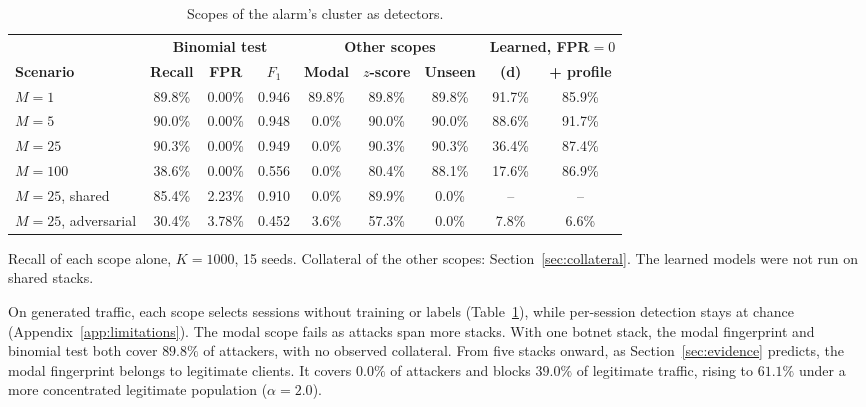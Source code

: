 \documentclass[conference,letterpaper,10pt]{IEEEtran}
\newcommand\1{\textit{(i)}}
\newcommand\2{\textit{(ii)}}
\newcommand\3{\textit{(iii)}}
\newcommand\4{\textit{(iv)}}
\newcommand\5{\textit{(v)}}
\newcommand\6{\textit{(vi)}}
\newcommand\7{\textit{(vii)}}
\newcommand\8{\textit{(viii)}}
\newcommand\9{\textit{(ix)}}
\begin{document}
\begin{table}[t]
\centering
\caption{Scopes of the alarm's cluster as detectors.}
\label{tab:symbolic}
\scriptsize
\setlength{\tabcolsep}{1.6pt}
\begin{tabular}{@{}lcccccccc@{}}
\toprule
 & \multicolumn{3}{c}{\textbf{Binomial test}} & \multicolumn{3}{c}{\textbf{Other scopes}} & \multicolumn{2}{c}{\textbf{Learned, FPR${}=0$}} \\
\cmidrule(lr){2-4}\cmidrule(lr){5-7}\cmidrule(l){8-9}
\textbf{Scenario} & \textbf{Recall} & \textbf{FPR} & \textbf{$F_1$} & \textbf{Modal} & \textbf{$z$-score} & \textbf{Unseen} & \textbf{(d)} & \textbf{+ profile} \\
\midrule
$M{=}1$               & 89.8\% & 0.00\% & 0.946 & 89.8\% & 89.8\% & 89.8\% & 91.7\% & 85.9\% \\
$M{=}5$               & 90.0\% & 0.00\% & 0.948 & 0.0\% & 90.0\% & 90.0\% & 88.6\% & 91.7\% \\
$M{=}25$              & 90.3\% & 0.00\% & 0.949 & 0.0\% & 90.3\% & 90.3\% & 36.4\% & 87.4\% \\
$M{=}100$             & 38.6\% & 0.00\% & 0.556 & 0.0\% & 80.4\% & 88.1\% & 17.6\% & 86.9\% \\
$M{=}25$, shared      & 85.4\% & 2.23\% & 0.910 & 0.0\% & 89.9\% & 0.0\% & -- & -- \\
$M{=}25$, adversarial & 30.4\% & 3.78\% & 0.452 & 3.6\% & 57.3\% & 0.0\% & 7.8\% & 6.6\% \\
\bottomrule
\end{tabular}

\vspace{2pt}
{\footnotesize Recall of each scope alone, $K = 1000$, 15 seeds. Collateral of the other scopes: Section~\ref{sec:collateral}. The learned models were not run on shared stacks.}
\end{table}

On generated traffic, each scope selects sessions without
training or labels (Table~\ref{tab:symbolic}), while
per-session detection stays at chance
(Appendix~\ref{app:limitations}). The modal scope fails as
attacks span more stacks. With one
botnet stack, the modal fingerprint and binomial test both
cover $89.8\%$ of attackers, with no observed collateral.
From five stacks onward, as Section~\ref{sec:evidence}
predicts, the modal fingerprint belongs to legitimate
clients. It covers $0.0\%$ of attackers and blocks $39.0\%$
of legitimate traffic, rising to $61.1\%$ under a more
concentrated legitimate population ($\alpha = 2.0$).
\end{document}
